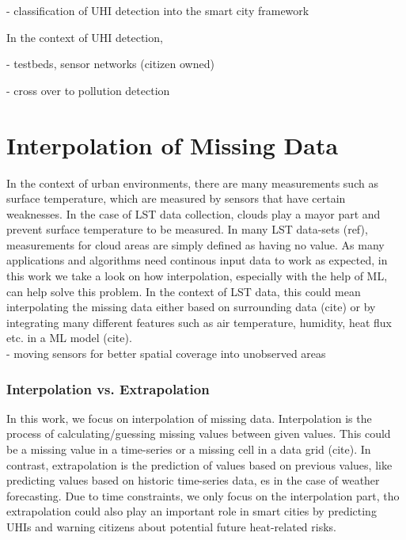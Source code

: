 - classification of UHI detection into the smart city framework

In the context of UHI detection,

- testbeds, sensor networks (citizen owned)

- cross over to pollution detection

\section{Interpolation of Missing Data}


In the context of urban environments, there are many measurements such as surface temperature, which are measured by sensors that have certain weaknesses. In the case of LST data collection, clouds play a mayor part and prevent surface temperature to be measured. In many LST data-sets (ref), measurements for cloud areas are simply defined as having no value. As many applications and algorithms need continous input data to work as expected, in this work we take a look on how interpolation, especially with the help of ML, can help solve this problem. In the context of LST data, this could mean interpolating the missing data either based on surrounding data (cite) or by integrating many different features such as air temperature, humidity, heat flux etc. in a ML model (cite).\\
- moving sensors for better spatial coverage into unobserved areas

\subsubsection{Interpolation vs. Extrapolation}

In this work, we focus on interpolation of missing data. Interpolation is the process of calculating/guessing missing values between given values. This could be a missing value in a time-series or a missing cell in a data grid (cite). In contrast, extrapolation is the prediction of values based on previous values, like predicting values based on historic time-series data, es in the case of weather forecasting. Due to time constraints, we only focus on the interpolation part, tho extrapolation could also play an important role in smart cities by predicting UHIs and warning citizens about potential future heat-related risks.

